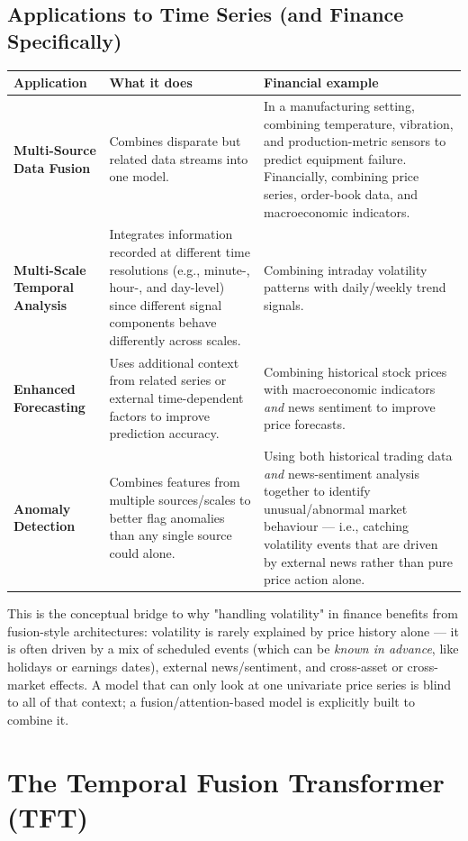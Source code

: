 \documentclass[12pt,openany]{book}
\theoremstyle{definition}
\theoremstyle{remark}
\begin{document}
\subsection{Applications to Time Series (and Finance Specifically)}

{\small
\begin{longtable}{@{}L{0.20\textwidth}L{0.34\textwidth}L{0.38\textwidth}@{}}
\toprule
Application & What it does & Financial example \\
\midrule
\textbf{Multi-Source Data Fusion} & Combines disparate but related data streams into one model. & In a manufacturing setting, combining temperature, vibration, and production-metric sensors to predict equipment failure. Financially, combining price series, order-book data, and macroeconomic indicators. \\
\textbf{Multi-Scale Temporal Analysis} & Integrates information recorded at different time resolutions (e.g., minute-, hour-, and day-level) since different signal components behave differently across scales. & Combining intraday volatility patterns with daily/weekly trend signals. \\
\textbf{Enhanced Forecasting} & Uses additional context from related series or external time-dependent factors to improve prediction accuracy. & Combining historical stock prices with macroeconomic indicators \emph{and} news sentiment to improve price forecasts. \\
\textbf{Anomaly Detection} & Combines features from multiple sources/scales to better flag anomalies than any single source could alone. & Using both historical trading data \emph{and} news-sentiment analysis together to identify unusual/abnormal market behaviour --- i.e., catching volatility events that are driven by external news rather than pure price action alone. \\
\bottomrule
\end{longtable}
}

This is the conceptual bridge to why "handling volatility" in finance benefits from fusion-style architectures: volatility is rarely explained by price history alone --- it is often driven by a mix of scheduled events (which can be \emph{known in advance}, like holidays or earnings dates), external news/sentiment, and cross-asset or cross-market effects. A model that can only look at one univariate price series is blind to all of that context; a fusion/attention-based model is explicitly built to combine it.

\section{The Temporal Fusion Transformer (TFT)}
\end{document}
